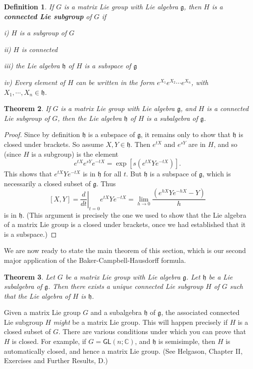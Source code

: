 \documentclass[12pt]{amsbook}
\let \frak = \mathfrak
\theoremstyle{plain}
\newtheorem{theorem}{Theorem}
\newtheorem{definition}[theorem]{Definition}
\numberwithin{equation}{chapter}
\numberwithin{theorem}{chapter}
\begin{document}
\begin{definition}
If $G$ is a matrix Lie group with Lie algebra $\frak{g}$, then $H$ is a
\textbf{connected Lie subgroup} of $G$ if

i) $H$ is a subgroup of $G$

ii) $H$ is connected

iii) the Lie algebra $\frak{h}$ of $H$ is a subspace of $\frak{g}$

iv) Every element of $H$ can be written in the form $e^{X_{1}}e^{X_{2}}\cdots
e^{X_{n}}$, with $X_{1},\cdots,X_{n}\in\frak{h}$.
\end{definition}

\begin{theorem}
If $G$ is a matrix Lie group with Lie algebra $\frak{g}$, and $H$ is a
connected Lie subgroup of $G$, then the Lie algebra $\frak{h}$ of $H$ is a
subalgebra of $\frak{g}$.
\end{theorem}

\begin{proof}
Since by definition $\frak{h}$ is a subspace of $\frak{g}$, it remains only to
show that $\frak{h}$ is closed under brackets. So assume $X,Y\in\frak{h}$.
Then $e^{tX}$ and $e^{sY}$ are in $H$, and so (since $H$ is a subgroup) is the
element
\[
e^{tX}e^{sY}e^{-tX}=\exp\left[  s\left(  e^{tX}Ye^{-tX}\right)  \right]
\text{.}%
\]
This shows that $e^{tX}Ye^{-tX}$ is in $\frak{h}$ for all $t$. But $\frak{h}$
is a subspace of $\frak{g}$, which is necessarily a closed subset of
$\frak{g}$. Thus
\[
\left[  X,Y\right]  =\left.  \frac{d}{dt}\right|  _{t=0}e^{tX}Ye^{-tX}%
=\lim_{h\rightarrow0}\frac{\left(  e^{hX}Ye^{-hX}-Y\right)  }{h}%
\]
is in $\frak{h}$. (This argument is precisely the one we used to show that the
Lie algebra of a matrix Lie group is a closed under brackets, once we had
established that it is a subspace.)
\end{proof}

We are now ready to state the main theorem of this section, which is our
second major application of the Baker-Campbell-Hausdorff formula.

\begin{theorem}
Let $G$ be a matrix Lie group with Lie algebra $\frak{g}$. Let $\frak{h}$ be a
Lie subalgebra of $\frak{g}$. Then there exists a unique connected Lie
subgroup $H$ of $G$ such that the Lie algebra of $H$ is $\frak{h}$.
\end{theorem}

Given a matrix Lie group $G$ and a subalgebra $\frak{h}$ of $\frak{g}$, the
associated connected Lie subgroup $H$ \textit{might} be a matrix Lie group.
This will happen precisely if $H$ is a closed subset of $G$. There are various
conditions under which you can prove that $H$ is closed. For example, if
$G=\mathsf{GL}\left(  n;\mathbb{C}\right)  $, and $\frak{h}$ is semisimple,
then $H$ is automatically closed, and hence a matrix Lie group. (See Helgason,
Chapter II, Exercises and Further Results, D.)
\end{document}
